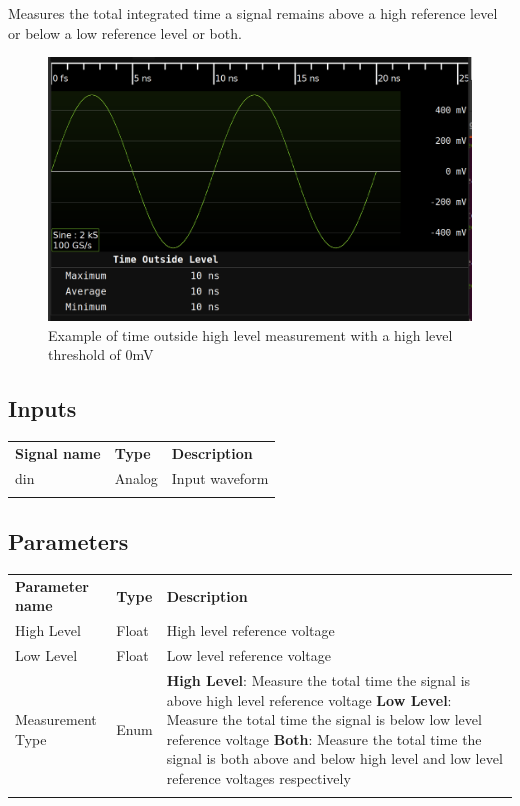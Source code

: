 Measures the total integrated time a signal remains above a high reference level or below a low reference level or both.

\begin{figure}[h]
	\centering
	\includegraphics[width=16cm]{images/filters/time-outside-level.png}
	\caption{Example of time outside high level measurement with a high level threshold of 0mV}
	\label{filter_timeoutsidelevel}
	\end{figure}

\subsection{Inputs}

\begin{tabularx}{16cm}{llX}
\thickhline
\textbf{Signal name} & \textbf{Type} & \textbf{Description} \\
\thickhline
din & Analog & Input waveform \\
\thickhline
\end{tabularx}

\subsection{Parameters}

\begin{tabularx}{16cm}{llX}
\thickhline
\textbf{Parameter name} & \textbf{Type} & \textbf{Description} \\
\thickhline
High Level & Float & High level reference voltage\\
\thickhline
Low Level & Float & Low level reference voltage\\
\thickhline
Measurement Type & Enum &
	\textbf{High Level}: Measure the total time the signal is above high level reference voltage \newline
	\textbf{Low Level}: Measure the total time the signal is below low level reference voltage \newline
	\textbf{Both}: Measure the total time the signal is both above and below high level and low level reference voltages respectively\\
\thickhline
\end{tabularx}

